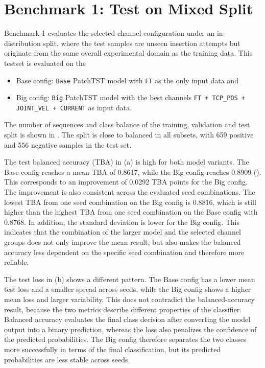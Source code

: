 \section{Benchmark 1: Test on Mixed Split}
\label{sec:results_benchmark1}
Benchmark 1 evaluates the selected channel configuration under an in-distribution split, where the test samples are unseen insertion attempts but originate from the same overall experimental domain as the training data. This testset is evaluated on the
\begin{itemize}
    \item Base config: \texttt{Base} PatchTST model with \texttt{FT} as the only input data and
    \item Big config: \texttt{Big} PatchTST model with the best channels \texttt{FT + TCP\_POS + JOINT\_VEL + CURRENT} as input data.
\end{itemize}

The number of sequences and class balance of the training, validation and test split is shown in . The split is close to balanced in all subsets, with 659 positive and 556 negative samples in the test set.

The test balanced accuracy (TBA) in  (a) is high for both model variants. The Base config reaches a mean TBA of 0.8617, while the Big config reaches 0.8909 (). This corresponds to an improvement of 0.0292 TBA points for the Big config. The improvement is also consistent across the evaluated seed combinations. The lowest TBA from one seed combination on the Big config is 0.8816, which is still higher than the highest TBA from one seed combination on the Base config with 0.8768. In addition, the standard deviation is lower for the Big config. This indicates that the combination of the larger model and the selected channel groups does not only improve the mean result, but also makes the balanced accuracy less dependent on the specific seed combination and therefore more reliable.

The test loss in  (b) shows a different pattern. The Base config has a lower mean test loss and a smaller spread across seeds, while the Big config shows a higher mean loss and larger variability. This does not contradict the balanced-accuracy result, because the two metrics describe different properties of the classifier. Balanced accuracy evaluates the final class decision after converting the model output into a binary prediction, whereas the loss also penalizes the confidence of the predicted probabilities. The Big config therefore separates the two classes more successfully in terms of the final classification, but its predicted probabilities are less stable across seeds.

